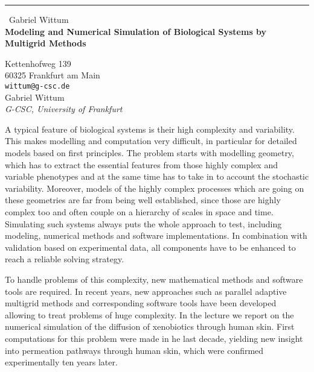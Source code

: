 \documentclass{report}
\begin{document}
\begin{center}
\rule{6in}{1pt} \
{\large Gabriel Wittum \\
{\bf Modeling and Numerical Simulation of Biological Systems by Multigrid Methods}}

Kettenhofweg 139 \\ 60325 Frankfurt am Main
\\
{\tt wittum@g-csc.de}\\
Gabriel Wittum\\
{\em G-CSC, University of Frankfurt}\end{center}

A typical feature of biological systems is their high complexity and
variability. This makes modelling and computation very difficult, in
particular for detailed models based on first principles. The problem
starts with modelling geometry, which has to extract the essential
features from those highly complex and variable phenotypes and at the
same time has to take in to account the stochastic variability. Moreover,
models of the highly complex processes which are going on these
geometries are far from being well established, since those are highly
complex too and often couple on a hierarchy of scales in space and time.
Simulating such systems always puts the whole approach to test, including
modeling, numerical methods and software implementations. In combination
with validation based on experimental data, all components have to be
enhanced to reach a reliable solving strategy.

To handle problems of this complexity, new mathematical methods and
software tools are required. In recent years, new approaches such as
parallel adaptive multigrid methods and corresponding software tools have
been developed allowing to treat problems of huge complexity. In the
lecture we report on the numerical simulation of the diffusion of
xenobiotics through human skin. First computations for this problem were
made in he last decade, yielding new insight into permeation pathways
through human skin, which were confirmed experimentally ten years later.
\end{document}
